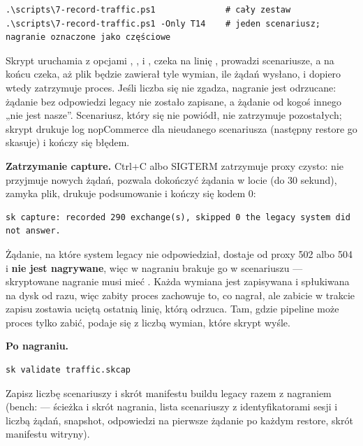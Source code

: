 \begin{lstlisting}
.\scripts\7-record-traffic.ps1              # cały zestaw
.\scripts\7-record-traffic.ps1 -Only T14    # jeden scenariusz; nagranie oznaczone jako częściowe
\end{lstlisting}

Skrypt uruchamia  z opcjami , ,
 i , czeka na linię
, prowadzi scenariusze, a na końcu czeka, aż plik będzie
zawierał tyle wymian, ile żądań wysłano, i dopiero wtedy zatrzymuje proces. Jeśli liczba
się nie zgadza, nagranie jest odrzucane: żądanie bez odpowiedzi legacy nie zostało
zapisane, a żądanie od kogoś innego „nie jest nasze”. Scenariusz, który się nie powiódł,
nie zatrzymuje pozostałych; skrypt drukuje log nopCommerce dla nieudanego scenariusza
(następny restore go skasuje) i kończy się błędem.

\textbf{Zatrzymanie capture.} Ctrl+C albo SIGTERM zatrzymuje proxy czysto: nie przyjmuje
nowych żądań, pozwala dokończyć żądania w locie (do 30 sekund), zamyka plik, drukuje
podsumowanie i kończy się kodem 0:

\begin{lstlisting}
sk capture: recorded 290 exchange(s), skipped 0 the legacy system did not answer.
\end{lstlisting}

Żądanie, na które system legacy nie odpowiedział, dostaje od proxy 502 albo 504 i
\textbf{nie jest nagrywane}, więc w nagraniu brakuje go w scenariuszu --- skryptowane
nagranie musi mieć . Każda wymiana jest zapisywana i spłukiwana na
dysk od razu, więc zabity proces zachowuje to, co nagrał, ale zabicie w trakcie zapisu
zostawia uciętą ostatnią linię, którą  odrzuca. Tam, gdzie pipeline
może proces tylko zabić, podaje się  z liczbą wymian, które
skrypt wyśle.

\textbf{Po nagraniu.}
\begin{lstlisting}
sk validate traffic.skcap
\end{lstlisting}
Zapisz liczbę scenariuszy i skrót manifestu buildu legacy razem z nagraniem (bench:
 --- ścieżka i skrót nagrania, lista scenariuszy z
identyfikatorami sesji i liczbą żądań, snapshot, odpowiedzi na pierwsze żądanie po każdym
restore, skrót manifestu witryny).

